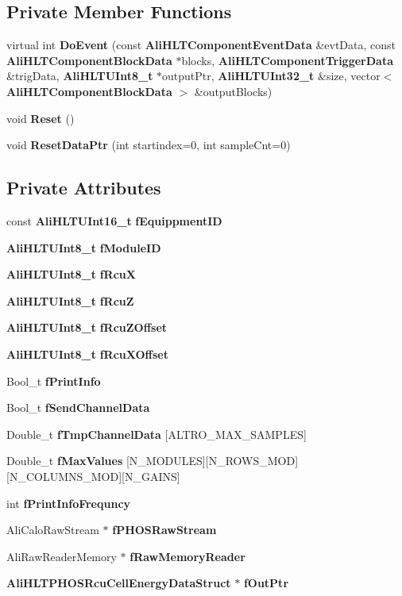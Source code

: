 \subsection*{Private Member Functions}
\begin{CompactItemize}
\item 
virtual int {\bf Do\-Event} (const {\bf Ali\-HLTComponent\-Event\-Data} \&evt\-Data, const {\bf Ali\-HLTComponent\-Block\-Data} $\ast$blocks, {\bf Ali\-HLTComponent\-Trigger\-Data} \&trig\-Data, {\bf Ali\-HLTUInt8\_\-t} $\ast$output\-Ptr, {\bf Ali\-HLTUInt32\_\-t} \&size, vector$<$ {\bf Ali\-HLTComponent\-Block\-Data} $>$ \&output\-Blocks)
\item 
void {\bf Reset} ()
\item 
void {\bf Reset\-Data\-Ptr} (int startindex=0, int sample\-Cnt=0)
\end{CompactItemize}
\subsection*{Private Attributes}
\begin{CompactItemize}
\item 
const {\bf Ali\-HLTUInt16\_\-t} {\bf f\-Equippment\-ID}
\item 
{\bf Ali\-HLTUInt8\_\-t} {\bf f\-Module\-ID}
\item 
{\bf Ali\-HLTUInt8\_\-t} {\bf f\-Rcu\-X}
\item 
{\bf Ali\-HLTUInt8\_\-t} {\bf f\-Rcu\-Z}
\item 
{\bf Ali\-HLTUInt8\_\-t} {\bf f\-Rcu\-ZOffset}
\item 
{\bf Ali\-HLTUInt8\_\-t} {\bf f\-Rcu\-XOffset}
\item 
Bool\_\-t {\bf f\-Print\-Info}
\item 
Bool\_\-t {\bf f\-Send\-Channel\-Data}
\item 
Double\_\-t {\bf f\-Tmp\-Channel\-Data} [ALTRO\_\-MAX\_\-SAMPLES]
\item 
Double\_\-t {\bf f\-Max\-Values} [N\_\-MODULES][N\_\-ROWS\_\-MOD][N\_\-COLUMNS\_\-MOD][N\_\-GAINS]
\item 
int {\bf f\-Print\-Info\-Frequncy}
\item 
Ali\-Calo\-Raw\-Stream $\ast$ {\bf f\-PHOSRaw\-Stream}
\item 
Ali\-Raw\-Reader\-Memory $\ast$ {\bf f\-Raw\-Memory\-Reader}
\item 
{\bf Ali\-HLTPHOSRcu\-Cell\-Energy\-Data\-Struct} $\ast$ {\bf f\-Out\-Ptr}
\end{CompactItemize}
